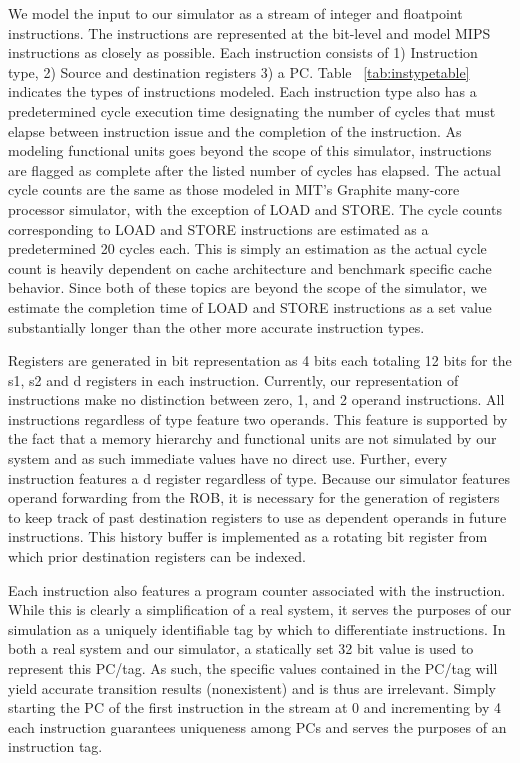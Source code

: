 We model the input to our simulator as a stream of integer and floatpoint instructions.  The instructions are represented at the bit-level and model MIPS instructions as closely as possible.  Each instruction consists of 1) Instruction type, 2) Source and destination registers 3) a PC.  Table ~\ref{tab:instypetable} indicates the types of instructions modeled.  Each instruction type also has a predetermined cycle execution time designating the number of cycles that must elapse between instruction issue and the completion of the instruction.  As modeling functional units goes beyond the scope of this simulator, instructions are flagged as complete after the listed number of cycles has elapsed.  The actual cycle counts are the same as those modeled in MIT's Graphite many-core processor simulator\cite{graphite}, with the exception of LOAD and STORE.  The cycle counts corresponding to LOAD and STORE instructions are estimated as a predetermined 20 cycles each.  This is simply an estimation as the actual cycle count is heavily dependent on cache architecture and benchmark specific cache behavior.  Since both of these topics are beyond the scope of the simulator, we estimate the completion time of LOAD and STORE instructions as a set value substantially longer than the other more accurate instruction types.

Registers are generated in bit representation as 4 bits each totaling 12 bits for the s1, s2 and d registers in each instruction. Currently, our representation of instructions make no distinction between zero, 1, and 2 operand instructions.  All instructions regardless of type feature two operands.  This feature is supported by the fact that a memory hierarchy and functional units are not simulated by our system and as such immediate values have no direct use.  Further, every instruction features a d register regardless of type.  Because our simulator features operand forwarding from the ROB, it is necessary for the generation of registers to keep track of past destination registers to use as dependent operands in future instructions.  This history buffer is implemented as a rotating bit register from which prior destination registers can be indexed.

Each instruction also features a program counter associated with the instruction.  While this is clearly a simplification of a real system, it serves the purposes of our simulation as a uniquely identifiable tag by which to differentiate instructions.  In both a real system and our simulator, a statically set 32 bit value is used to represent this PC/tag.  As such, the specific values contained in the PC/tag will yield accurate transition results (nonexistent) and is thus are irrelevant.  Simply starting the PC of the first instruction in the stream at 0 and incrementing by 4 each instruction guarantees uniqueness among PCs and serves the purposes of an instruction tag.

